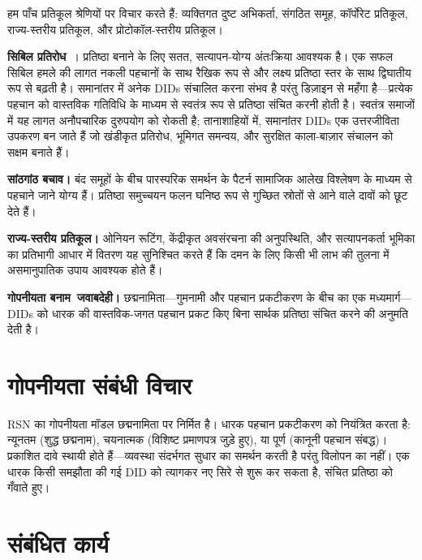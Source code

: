 \documentclass[11pt,a4paper,twocolumn]{article}
\begin{document}
हम पाँच प्रतिकूल श्रेणियों पर विचार करते हैं: व्यक्तिगत दुष्ट अभिकर्ता, संगठित समूह, कॉर्पोरेट प्रतिकूल, राज्य-स्तरीय प्रतिकूल, और प्रोटोकॉल-स्तरीय प्रतिकूल।

\textbf{सिबिल प्रतिरोध}~\cite{douceur2002}। प्रतिष्ठा बनाने के लिए सतत, सत्यापन-योग्य अंतःक्रिया आवश्यक है। एक सफल सिबिल हमले की लागत नकली पहचानों के साथ रैखिक रूप से और लक्ष्य प्रतिष्ठा स्तर के साथ द्विघातीय रूप से बढ़ती है। समानांतर में अनेक DIDs संचालित करना संभव है परंतु डिज़ाइन से महँगा है---प्रत्येक पहचान को वास्तविक गतिविधि के माध्यम से स्वतंत्र रूप से प्रतिष्ठा संचित करनी होती है। स्वतंत्र समाजों में यह लागत अनौपचारिक दुरुपयोग को रोकती है; तानाशाहियों में, समानांतर DIDs एक उत्तरजीविता उपकरण बन जाते हैं जो खंडीकृत प्रतिरोध, भूमिगत समन्वय, और सुरक्षित काला-बाज़ार संचालन को सक्षम बनाते हैं।

\textbf{सांठगांठ बचाव।} बंद समूहों के बीच पारस्परिक समर्थन के पैटर्न सामाजिक आलेख विश्लेषण के माध्यम से पहचाने जाने योग्य हैं। प्रतिष्ठा समुच्चयन फलन घनिष्ठ रूप से गुच्छित स्रोतों से आने वाले दावों को छूट देते हैं।

\textbf{राज्य-स्तरीय प्रतिकूल।} ओनियन रूटिंग, केंद्रीकृत अवसंरचना की अनुपस्थिति, और सत्यापनकर्ता भूमिका का प्रतिभागी आधार में वितरण यह सुनिश्चित करते हैं कि दमन के लिए किसी भी लाभ की तुलना में असमानुपातिक उपाय आवश्यक होते हैं।

\textbf{गोपनीयता बनाम\ जवाबदेही।} छद्मनामिता---गुमनामी और पहचान प्रकटीकरण के बीच का एक मध्यमार्ग---DIDs को धारक की वास्तविक-जगत पहचान प्रकट किए बिना सार्थक प्रतिष्ठा संचित करने की अनुमति देती है।

\section{गोपनीयता संबंधी विचार}

RSN का गोपनीयता मॉडल छद्मनामिता पर निर्मित है। धारक पहचान प्रकटीकरण को नियंत्रित करता है: न्यूनतम (शुद्ध छद्मनाम), चयनात्मक (विशिष्ट प्रमाणपत्र जुड़े हुए), या पूर्ण (कानूनी पहचान संबद्ध)। प्रकाशित दावे स्थायी होते हैं---व्यवस्था संदर्भगत सुधार का समर्थन करती है परंतु विलोपन का नहीं। एक धारक किसी समझौता की गई DID को त्यागकर नए सिरे से शुरू कर सकता है, संचित प्रतिष्ठा को गँवाते हुए।

\section{संबंधित कार्य}
\end{document}
